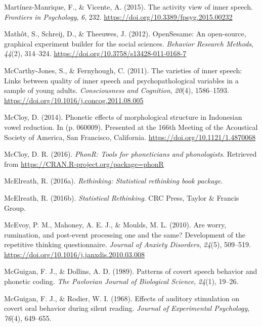 \documentclass[a4paper,12pt,twoside,onecolumn,openright,final,oldfontcommands]{memoir}
\begin{document}
\leavevmode\hypertarget{ref-Martinez-Manrique2015}{}%
Martínez-Manrique, F., \& Vicente, A. (2015). The activity view of inner speech. \emph{Frontiers in Psychology}, \emph{6}, 232. \url{https://doi.org/10.3389/fpsyg.2015.00232}

\leavevmode\hypertarget{ref-mathot_opensesame_2012}{}%
Mathôt, S., Schreij, D., \& Theeuwes, J. (2012). OpenSesame: An open-source, graphical experiment builder for the social sciences. \emph{Behavior Research Methods}, \emph{44}(2), 314--324. \url{https://doi.org/10.3758/s13428-011-0168-7}

\leavevmode\hypertarget{ref-McCarthy-Jones2011}{}%
McCarthy-Jones, S., \& Fernyhough, C. (2011). The varieties of inner speech: Links between quality of inner speech and psychopathological variables in a sample of young adults. \emph{Consciousness and Cognition}, \emph{20}(4), 1586--1593. \url{https://doi.org/10.1016/j.concog.2011.08.005}

\leavevmode\hypertarget{ref-mccloy_phonetic_2014}{}%
McCloy, D. (2014). Phonetic effects of morphological structure in Indonesian vowel reduction. In (p. 060009). Presented at the 166th Meeting of the Acoustical Society of America, San Francisco, California. \url{https://doi.org/10.1121/1.4870068}

\leavevmode\hypertarget{ref-R-phonR}{}%
McCloy, D. R. (2016). \emph{PhonR: Tools for phoneticians and phonologists}. Retrieved from \url{https://CRAN.R-project.org/package=phonR}

\leavevmode\hypertarget{ref-R-rethinking}{}%
McElreath, R. (2016a). \emph{Rethinking: Statistical rethinking book package}.

\leavevmode\hypertarget{ref-mcelreath_statistical_2016}{}%
McElreath, R. (2016b). \emph{Statistical Rethinking}. CRC Press, Taylor \& Francis Group.

\leavevmode\hypertarget{ref-McEvoy2010}{}%
McEvoy, P. M., Mahoney, A. E. J., \& Moulds, M. L. (2010). Are worry, rumination, and post-event processing one and the same? Development of the repetitive thinking questionnaire. \emph{Journal of Anxiety Disorders}, \emph{24}(5), 509--519. \url{https://doi.org/10.1016/j.janxdis.2010.03.008}

\leavevmode\hypertarget{ref-mcguigan_patterns_1989}{}%
McGuigan, F. J., \& Dollins, A. D. (1989). Patterns of covert speech behavior and phonetic coding. \emph{The Pavlovian Journal of Biological Science}, \emph{24}(1), 19--26.

\leavevmode\hypertarget{ref-mcguigan_effects_1968}{}%
McGuigan, F. J., \& Rodier, W. I. (1968). Effects of auditory stimulation on covert oral behavior during silent reading. \emph{Journal of Experimental Psychology}, \emph{76}(4), 649--655.
\end{document}
